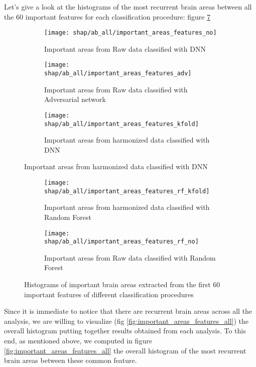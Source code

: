 \documentclass[10pt]{report}
\begin{document}
Let's give a look at the histograms of the most recurrent brain areas between all the 60 important features for each classification procedure: figure \ref{fig:histograms_60}

\begin{figure}
\centering
\begin{subfigure}[b]{1\columnwidth}
   \texttt{[image: shap/ab\_all/important\_areas\_features\_no]}
   \caption{Important areas from Raw data classified with DNN}
   \label{}
\end{subfigure}

\begin{subfigure}[b]{1\columnwidth}
   \texttt{[image: shap/ab\_all/important\_areas\_features\_adv]}
   \caption{Important areas from Raw data classified with Adversarial network}
   \label{}
\end{subfigure}

\begin{subfigure}[b]{1\columnwidth}
   \texttt{[image: shap/ab\_all/important\_areas\_features\_kfold]}
   \caption{Important areas from harmonized data classified with DNN}
   \label{}
\end{subfigure}
\end{figure}
\begin{figure}\ContinuedFloat
\begin{subfigure}[b]{1\columnwidth}
   \texttt{[image: shap/ab\_all/important\_areas\_features\_rf\_kfold]}
   \caption{Important areas from harmonized data classified with Random Forest}
   \label{}
\end{subfigure}

\begin{subfigure}[b]{1\columnwidth}
   \texttt{[image: shap/ab\_all/important\_areas\_features\_rf\_no]}
   \caption{Important areas from Raw data classified with Random Forest}
   \label{}
\end{subfigure}
\caption{Histograms of important brain areas extracted from the first 60 important features of different classification procedures}
\label{fig:histograms_60}
\end{figure}


Since it is immediate to notice that there are recurrent brain areas across all the analysis, we are willing to visualize (fig \ref{fig:important_areas_features_all}) the overall histogram putting together results obtained from each analysis.
To this end, as mentioned above, we computed in figure \ref{fig:important_areas_features_all} the overall histogram of the most recurrent brain areas between these common feature.
\end{document}
